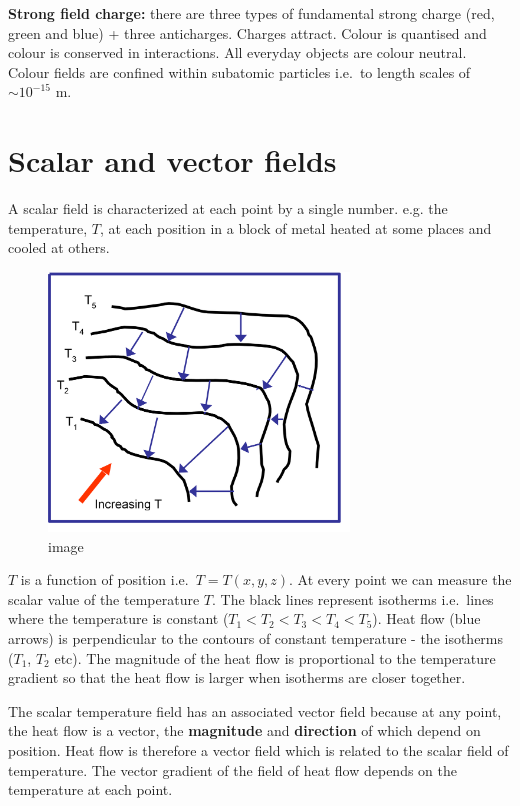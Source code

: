 \documentclass[
]{book}
\begin{document}
\textbf{Strong field charge:} there are three types of fundamental strong
charge (red, green and blue) + three anticharges. Charges attract.
Colour is quantised and colour is conserved in interactions. All
everyday objects are colour neutral. Colour fields are confined within
subatomic particles i.e.~to length scales of \(\sim 10^{-15}\) m.

\hypertarget{scalar-and-vector-fields}{%
\section{Scalar and vector fields}\label{scalar-and-vector-fields}}

A scalar field is characterized at each point by a single number. e.g.
the temperature, \(T\), at each position in a block of metal heated at
some places and cooled at others.

\begin{figure}
\centering
\includegraphics[width=80mm,height=\textheight]{Figures/isotherms.png}
\caption{image}
\end{figure}

\(T\) is a function of position i.e.~\(T = T(x,y,z)\). At every point we can
measure the scalar value of the temperature \(T\). The black lines
represent isotherms i.e.~lines where the temperature is constant
(\(T_1 < T_2 < T_3 < T_4 < T_5\)). Heat flow (blue arrows) is
perpendicular to the contours of constant temperature - the isotherms
(\(T_1\), \(T_2\) etc). The magnitude of the heat flow is proportional to
the temperature gradient so that the heat flow is larger when isotherms
are closer together.

The scalar temperature field has an associated vector field because at
any point, the heat flow is a vector, the \textbf{magnitude} and
\textbf{direction} of which depend on position. Heat flow is therefore a
vector field which is related to the scalar field of temperature. The
vector gradient of the field of heat flow depends on the temperature at
each point.
\end{document}
